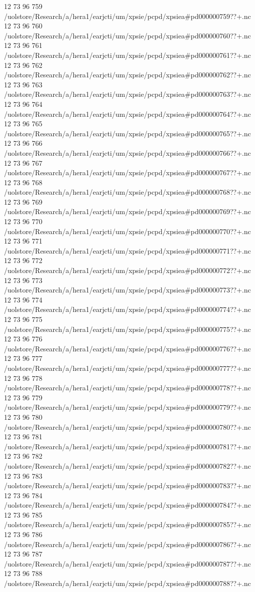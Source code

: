 12 73 96
759
/uolstore/Research/a/hera1/earjcti/um/xpsie/pcpd/xpsiea#pd000000759??+.nc
12 73 96
760
/uolstore/Research/a/hera1/earjcti/um/xpsie/pcpd/xpsiea#pd000000760??+.nc
12 73 96
761
/uolstore/Research/a/hera1/earjcti/um/xpsie/pcpd/xpsiea#pd000000761??+.nc
12 73 96
762
/uolstore/Research/a/hera1/earjcti/um/xpsie/pcpd/xpsiea#pd000000762??+.nc
12 73 96
763
/uolstore/Research/a/hera1/earjcti/um/xpsie/pcpd/xpsiea#pd000000763??+.nc
12 73 96
764
/uolstore/Research/a/hera1/earjcti/um/xpsie/pcpd/xpsiea#pd000000764??+.nc
12 73 96
765
/uolstore/Research/a/hera1/earjcti/um/xpsie/pcpd/xpsiea#pd000000765??+.nc
12 73 96
766
/uolstore/Research/a/hera1/earjcti/um/xpsie/pcpd/xpsiea#pd000000766??+.nc
12 73 96
767
/uolstore/Research/a/hera1/earjcti/um/xpsie/pcpd/xpsiea#pd000000767??+.nc
12 73 96
768
/uolstore/Research/a/hera1/earjcti/um/xpsie/pcpd/xpsiea#pd000000768??+.nc
12 73 96
769
/uolstore/Research/a/hera1/earjcti/um/xpsie/pcpd/xpsiea#pd000000769??+.nc
12 73 96
770
/uolstore/Research/a/hera1/earjcti/um/xpsie/pcpd/xpsiea#pd000000770??+.nc
12 73 96
771
/uolstore/Research/a/hera1/earjcti/um/xpsie/pcpd/xpsiea#pd000000771??+.nc
12 73 96
772
/uolstore/Research/a/hera1/earjcti/um/xpsie/pcpd/xpsiea#pd000000772??+.nc
12 73 96
773
/uolstore/Research/a/hera1/earjcti/um/xpsie/pcpd/xpsiea#pd000000773??+.nc
12 73 96
774
/uolstore/Research/a/hera1/earjcti/um/xpsie/pcpd/xpsiea#pd000000774??+.nc
12 73 96
775
/uolstore/Research/a/hera1/earjcti/um/xpsie/pcpd/xpsiea#pd000000775??+.nc
12 73 96
776
/uolstore/Research/a/hera1/earjcti/um/xpsie/pcpd/xpsiea#pd000000776??+.nc
12 73 96
777
/uolstore/Research/a/hera1/earjcti/um/xpsie/pcpd/xpsiea#pd000000777??+.nc
12 73 96
778
/uolstore/Research/a/hera1/earjcti/um/xpsie/pcpd/xpsiea#pd000000778??+.nc
12 73 96
779
/uolstore/Research/a/hera1/earjcti/um/xpsie/pcpd/xpsiea#pd000000779??+.nc
12 73 96
780
/uolstore/Research/a/hera1/earjcti/um/xpsie/pcpd/xpsiea#pd000000780??+.nc
12 73 96
781
/uolstore/Research/a/hera1/earjcti/um/xpsie/pcpd/xpsiea#pd000000781??+.nc
12 73 96
782
/uolstore/Research/a/hera1/earjcti/um/xpsie/pcpd/xpsiea#pd000000782??+.nc
12 73 96
783
/uolstore/Research/a/hera1/earjcti/um/xpsie/pcpd/xpsiea#pd000000783??+.nc
12 73 96
784
/uolstore/Research/a/hera1/earjcti/um/xpsie/pcpd/xpsiea#pd000000784??+.nc
12 73 96
785
/uolstore/Research/a/hera1/earjcti/um/xpsie/pcpd/xpsiea#pd000000785??+.nc
12 73 96
786
/uolstore/Research/a/hera1/earjcti/um/xpsie/pcpd/xpsiea#pd000000786??+.nc
12 73 96
787
/uolstore/Research/a/hera1/earjcti/um/xpsie/pcpd/xpsiea#pd000000787??+.nc
12 73 96
788
/uolstore/Research/a/hera1/earjcti/um/xpsie/pcpd/xpsiea#pd000000788??+.nc
